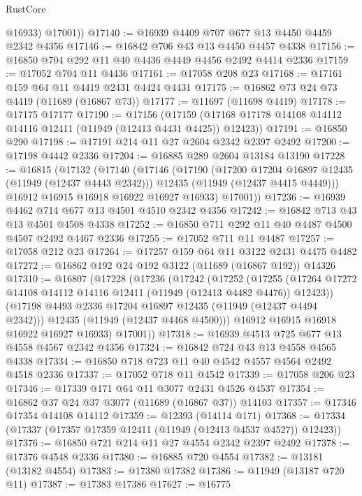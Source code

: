 \begin{lexlean}{RustCore}
\begin{coremodule}
          @16933)
        @17001))
@17140 := @16939 @4409 @707 @677 @13 @4450 @4459 @2342 @4356
@17146 := @16842 @706 @43 @13 @4450 @4457 @4338
@17156 := @16850 @704 @292 @11 @40 @4436 @4449 @4456 @2492 @4414 @2336
@17159 := @17052 @704 @11 @4436
@17161 := @17058 @208 @23
@17168 := @17161 @159 @64 @11 @4419 @2431 @4424 @4431
@17175 := @16862 @73 @24 @73 @4419 (@11689 (@16867 @73))
@17177 := @11697 (@11698 @4419)
@17178 := @17175 @17177
@17190 := @17156
    (@17159 (@17168 @17178 @14108 @14112 @14116 @12411 (@11949 (@12413 @4431 @4425)) @12423))
@17191 := @16850 @290
@17198 := @17191 @214 @11 @27 @2604 @2342 @2397 @2492
@17200 := @17198 @4442 @2336
@17204 := @16885 @289 @2604 @13184 @13190
@17228 := @16815
    (@17132
      (@17140
        (@17146
          (@17190
            (@17200 @17204 @16897 @12435 (@11949 (@12437 @4443 @2342)))
            @12435
            (@11949 (@12437 @4415 @4449)))
          @16912
          @16915
          @16918
          @16922
          @16927
          @16933)
        @17001))
@17236 := @16939 @4462 @714 @677 @13 @4501 @4510 @2342 @4356
@17242 := @16842 @713 @43 @13 @4501 @4508 @4338
@17252 := @16850 @711 @292 @11 @40 @4487 @4500 @4507 @2492 @4467 @2336
@17255 := @17052 @711 @11 @4487
@17257 := @17058 @212 @23
@17264 := @17257 @159 @64 @11 @3122 @2431 @4475 @4482
@17272 := @16862 @192 @24 @192 @3122 (@11689 (@16867 @192)) @14326
@17310 := @16807
    (@17228
      (@17236
        (@17242
          (@17252
            (@17255
              (@17264 @17272 @14108 @14112 @14116 @12411 (@11949 (@12413 @4482 @4476)) @12423))
            (@17198 @4493 @2336 @17204 @16897 @12435 (@11949 (@12437 @4494 @2342)))
            @12435
            (@11949 (@12437 @4468 @4500)))
          @16912
          @16915
          @16918
          @16922
          @16927
          @16933)
        @17001))
@17318 := @16939 @4513 @725 @677 @13 @4558 @4567 @2342 @4356
@17324 := @16842 @724 @43 @13 @4558 @4565 @4338
@17334 := @16850 @718 @723 @11 @40 @4542 @4557 @4564 @2492 @4518 @2336
@17337 := @17052 @718 @11 @4542
@17339 := @17058 @206 @23
@17346 := @17339 @171 @64 @11 @3077 @2431 @4526 @4537
@17354 := @16862 @37 @24 @37 @3077 (@11689 (@16867 @37)) @14103
@17357 := @17346 @17354 @14108 @14112
@17359 := @12393 (@14114 @171)
@17368 := @17334 (@17337 (@17357 @17359 @12411 (@11949 (@12413 @4537 @4527)) @12423))
@17376 := @16850 @721 @214 @11 @27 @4554 @2342 @2397 @2492
@17378 := @17376 @4548 @2336
@17380 := @16885 @720 @4554
@17382 := @13181 (@13182 @4554)
@17383 := @17380 @17382
@17386 := @11949 (@13187 @720 @11)
@17387 := @17383 @17386
@17627 := @16775

\end{coremodule}
\end{lexlean}
